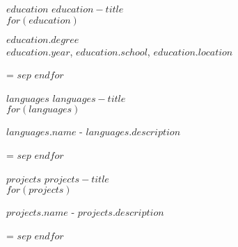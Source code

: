 \documentclass[11pt,a4paper]{article}
\newcommand{\spaceXL} {\vspace{20pt}}
\newcommand{\spaceM} {\vspace{8pt}}
\newcommand{\spaceS} {\vspace{4pt}}
\newcommand{\sectionTitle}[1]{\textcolor{secondaryColor}{\uppercase{\small{#1}}}}
\newcommand{\contentTitle}[1] {\MakeUppercase\normalsize\textbf{#1}}
\newcommand{\contentSubTitle}[1] {\normalsize\textcolor{secondaryColor}{#1}}
\newcommand{\content}[1] {\normalsize{#1}}
\newenvironment{absolutelynopagebreak}
  {\par\nobreak\vfil\penalty0\vfilneg
   \vtop\bgroup}
  {\par\xdef\tpd{\the\prevdepth}\egroup
   \prevdepth=\tpd}
\def \ifNotEmpty#1{\def\temp{#1} \ifx\temp\empty \else}
\begin{document}
\ifNotEmpty{$education$}
  \spaceXL
  \sectionTitle{$education-title$} \\

  \spaceM
  $for(education)$
    \begin{absolutelynopagebreak}
      \contentTitle{$education.degree$} \\
      \contentSubTitle{$education.year$, $education.school$, $education.location$} \\
    \end{absolutelynopagebreak}
    $sep$\spaceS
  $endfor$
\fi

\ifNotEmpty{$languages$}
  \spaceXL
  \sectionTitle{$languages-title$} \\

  \spaceM
  $for(languages)$
    \begin{absolutelynopagebreak}
      \contentTitle{$languages.name$} - \content{$languages.description$} \\
    \end{absolutelynopagebreak}
    $sep$\spaceS
  $endfor$
\fi

\ifNotEmpty{$projects$}
  \spaceXL
  \sectionTitle{$projects-title$} \\

  \spaceM
  $for(projects)$
    \begin{absolutelynopagebreak}
      \contentTitle{$projects.name$} - \content{$projects.description$} \\
    \end{absolutelynopagebreak}
    $sep$\spaceS
  $endfor$
\fi
\end{document}
